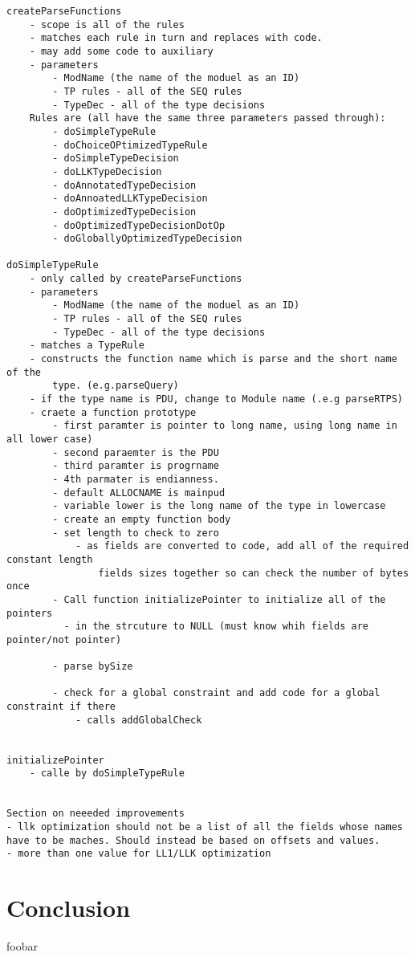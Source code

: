 \documentclass[12pt,oneside,letterpaper]{article}
\begin{document}
\begin{verbatim}
createParseFunctions
    - scope is all of the rules
    - matches each rule in turn and replaces with code.
    - may add some code to auxiliary
    - parameters
        - ModName (the name of the moduel as an ID)
        - TP rules - all of the SEQ rules
        - TypeDec - all of the type decisions
    Rules are (all have the same three parameters passed through):
        - doSimpleTypeRule
        - doChoiceOPtimizedTypeRule
        - doSimpleTypeDecision
        - doLLKTypeDecision
        - doAnnotatedTypeDecision
        - doAnnoatedLLKTypeDecision
        - doOptimizedTypeDecision
        - doOptimizedTypeDecisionDotOp
        - doGloballyOptimizedTypeDecision

doSimpleTypeRule
    - only called by createParseFunctions
    - parameters
        - ModName (the name of the moduel as an ID)
        - TP rules - all of the SEQ rules
        - TypeDec - all of the type decisions
    - matches a TypeRule 
    - constructs the function name which is parse and the short name of the
        type. (e.g.parseQuery)
    - if the type name is PDU, change to Module name (.e.g parseRTPS)
    - craete a function prototype
        - first paramter is pointer to long name, using long name in all lower case)
        - second paraemter is the PDU
        - third paramter is progrname
        - 4th parmater is endianness.
        - default ALLOCNAME is mainpud
        - variable lower is the long name of the type in lowercase
        - create an empty function body
        - set length to check to zero
            - as fields are converted to code, add all of the required constant length
                fields sizes together so can check the number of bytes once
        - Call function initializePointer to initialize all of the pointers 
          - in the strcuture to NULL (must know whih fields are pointer/not pointer)
         
        - parse bySize
        
        - check for a global constraint and add code for a global constraint if there
            - calls addGlobalCheck
        
        
initializePointer
    - calle by doSimpleTypeRule
    
    
Section on neeeded improvements
- llk optimization should not be a list of all the fields whose names have to be maches. Should instead be based on offsets and values. 
- more than one value for LL1/LLK optimization

\end{verbatim}

\section{Conclusion}
foobar



\end{document}
